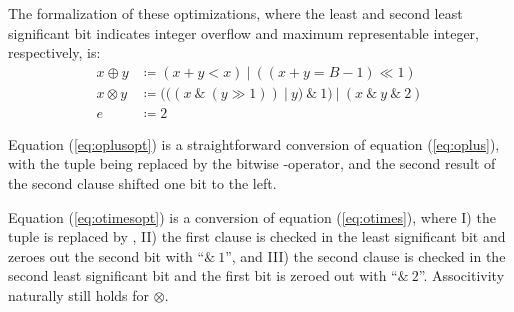 The formalization of these optimizations, where the least and second least
significant bit indicates integer overflow and maximum representable integer,
respectively, is:
\begin{align}
  \label{eq:oplusopt}
  x \oplus y &\coloneq (x + y < x)~|~((x + y = B-1) \ll 1) \\
  \label{eq:otimesopt}
  x \otimes y &\coloneq (((x~\&~(y \gg 1))~|~y)~\&~1)~|~(x~\&~y~\&~2)\\
  \label{eq:otimesneopt}
  e &\coloneq 2
\end{align}

Equation (\ref{eq:oplusopt}) is a straightforward conversion of equation
(\ref{eq:oplus}), with the tuple being replaced by the bitwise
-operator, and the second result of the second clause shifted one bit to
the left.

Equation (\ref{eq:otimesopt}) is a conversion of equation (\ref{eq:otimes}),
where I) the tuple is replaced by , II) the first clause is checked in
the least significant bit and zeroes out the second bit with ``$\&~1$'', and
III) the second clause is checked in the second least significant bit and the
first bit is zeroed out with ``$\&~2$''. Associtivity naturally still holds for
$\otimes$.

